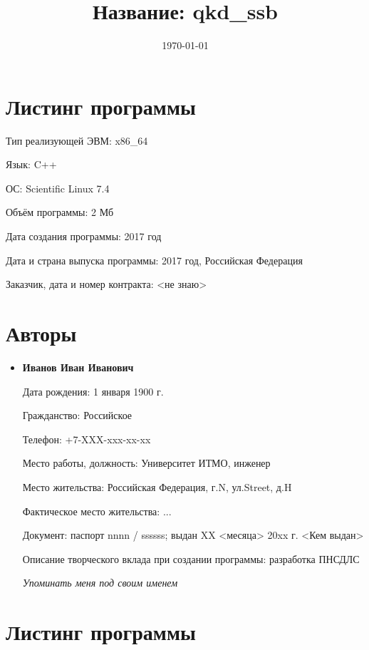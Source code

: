 \documentclass{article}
\title{Название: qkd\_ssb}
\date{\today}
\begin{document}
\maketitle


\section{Листинг программы}
Тип реализующей ЭВМ: x86\_64

Язык: C++

ОС: Scientific Linux 7.4

Объём программы: 2 Мб

Дата создания программы: 2017 год

Дата и страна выпуска программы: 2017 год, Российская Федерация

Заказчик, дата и номер контракта: <не знаю>


\section{Авторы}
\begin{itemize}
    \item
    \textbf{Иванов Иван Иванович}

    Дата рождения: 1 января 1900 г.

    Гражданство: Российское

    Телефон: +7-XXX-xxx-xx-xx

    Место работы, должность: Университет ИТМО, инженер

    Место жительства: Российская Федерация, г.N, ул.Street, д.H

    Фактическое место жительства: ...

    Документ: паспорт nnnn / ssssss; выдан XX <месяца> 20xx г. <Кем выдан>

    Описание творческого вклада при создании программы: разработка ПНСДЛС

    \textit{Упоминать меня под своим именем}

\end{itemize}

\section{Листинг программы}
\end{document}
